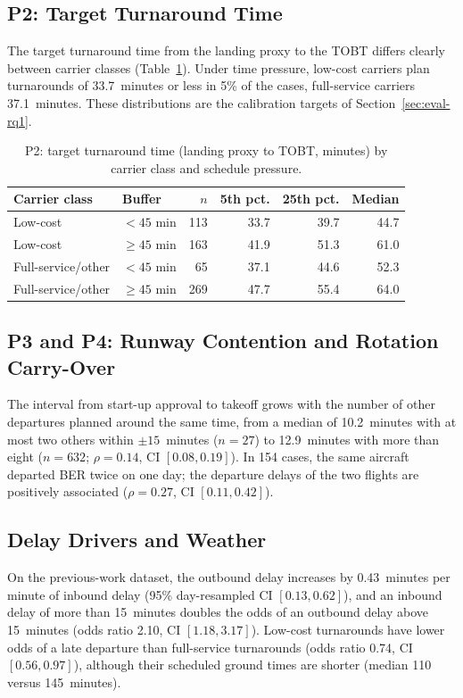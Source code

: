 \subsection{P2: Target Turnaround Time}
The target turnaround time from the landing proxy to the TOBT differs clearly between carrier classes (Table~\ref{tab:p2}). Under time pressure, low-cost carriers plan turnarounds of 33.7~minutes or less in 5\% of the cases, full-service carriers 37.1~minutes. These distributions are the calibration targets of Section~\ref{sec:eval-rq1}.

\begin{table}[htbp]\centering\small
\begin{tabular}{llrrrr}\hline
Carrier class & Buffer & $n$ & 5th pct. & 25th pct. & Median\\\hline
Low-cost & $<45$ min & 113 & 33.7 & 39.7 & 44.7\\
Low-cost & $\ge45$ min & 163 & 41.9 & 51.3 & 61.0\\
Full-service/other & $<45$ min & 65 & 37.1 & 44.6 & 52.3\\
Full-service/other & $\ge45$ min & 269 & 47.7 & 55.4 & 64.0\\\hline
\end{tabular}
\caption{P2: target turnaround time (landing proxy to TOBT, minutes) by carrier class and schedule pressure.}
\label{tab:p2}
\end{table}

\subsection{P3 and P4: Runway Contention and Rotation Carry-Over}
The interval from start-up approval to takeoff grows with the number of other departures planned around the same time, from a median of 10.2~minutes with at most two others within $\pm15$~minutes ($n=27$) to 12.9~minutes with more than eight ($n=632$; $\rho=0.14$, CI $[0.08,0.19]$). In 154 cases, the same aircraft departed BER twice on one day; the departure delays of the two flights are positively associated ($\rho=0.27$, CI $[0.11,0.42]$).

\subsection{Delay Drivers and Weather}
On the previous-work dataset, the outbound delay increases by 0.43~minutes per minute of inbound delay (95\% day-resampled CI $[0.13,0.62]$), and an inbound delay of more than 15~minutes doubles the odds of an outbound delay above 15~minutes (odds ratio 2.10, CI $[1.18,3.17]$). Low-cost turnarounds have lower odds of a late departure than full-service turnarounds (odds ratio 0.74, CI $[0.56,0.97]$), although their scheduled ground times are shorter (median 110 versus 145~minutes).

